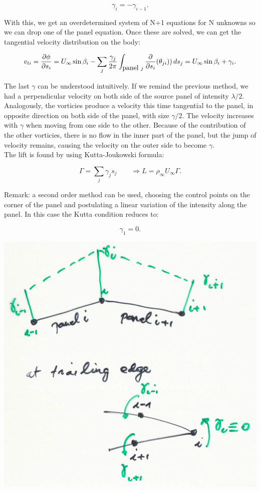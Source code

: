 	\begin{equation}
	\gamma _{i} = - \gamma _{i-1}.
	\end{equation}
	 
	 With this, we get an overdetermined system of N+1 equations for N unknowns so we can drop one of the panel equation. Once these are solved, we can get the tangential velocity distribution on the body:
	 
	 \begin{equation}
	 v_{ti} = \frac{\partial \phi}{\partial s_i} = U_\infty \sin \beta _i - \sum _j \frac{\gamma _j}{2\pi} \int _{\mbox{panel }j} \frac{\partial}{\partial s_i} (\theta_{ji})) \, ds_j = U_\infty \sin \beta _i + \gamma _i.
	 \end{equation}
	 
	 The last $\gamma$ can be understood intuitively. If we remind the previous method, we had a perpendicular velocity on both side of the source panel of intensity $\lambda /2$. Analogously, the vorticies produce a velocity this time tangential to the panel, in opposite direction on both side of the panel, with size $\gamma /2$. The velocity increases with $\gamma$ when moving from one side to the other. Because of the contribution of the other vorticies, there is no flow in the inner part of the panel, but the jump of velocity remains, causing the velocity on the outer side to become $\gamma$. \\
	 
	 The lift is found by using Kutta-Joukowski formula:
	 
	 \begin{equation}
	 \Gamma = \sum _j \gamma _j s_j\qquad \Rightarrow L = \rho _\infty U_\infty \Gamma.
	 \end{equation}
	 
	 Remark: a second order method can be used, choosing the control points on the corner of the panel and postulating a linear variation of the intensity along the panel. In this case the Kutta condition reduces to:
	 
	 \begin{equation}
	 \gamma _1 = 0.
	 \end{equation}
	 
	 \begin{center}
	 \includegraphics[scale=0.1]{ch2/44}
	 \end{center}